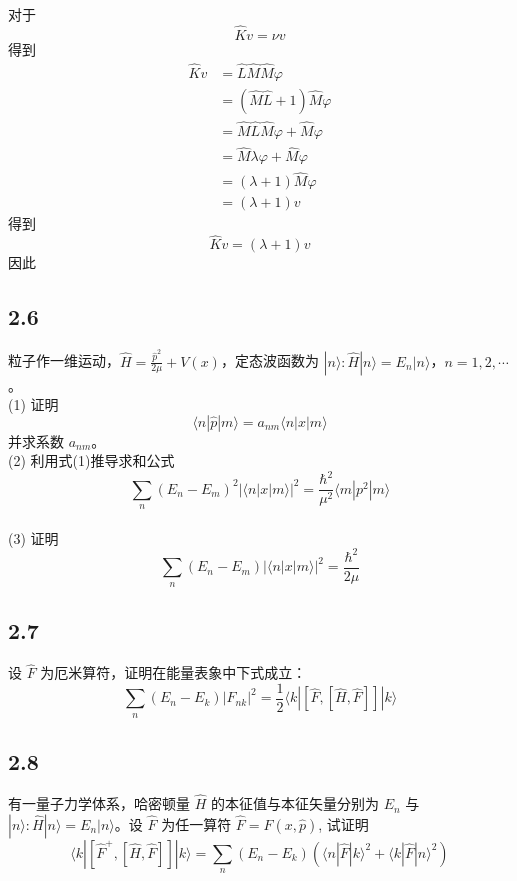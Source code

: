对于
\begin{equation}
    \hat{K}v=\nu v
\end{equation}
得到
\begin{equation}
    \begin{aligned}
        \hat{K}v&=\hat{L}\hat{M}\hat{M}\varphi 
\\
&=\left( \hat{M}\hat{L}+1 \right) \hat{M}\varphi 
\\
&=\hat{M}\hat{L}\hat{M}\varphi +\hat{M}\varphi 
\\
&=\hat{M}\lambda \varphi +\hat{M}\varphi 
\\
&=\left( \lambda +1 \right) \hat{M}\varphi 
\\
&=\left( \lambda +1 \right) v
    \end{aligned}
\end{equation}
得到
\begin{equation}
    \hat{K}v=\left( \lambda +1 \right) v
\end{equation}
因此

\subsection{2.6}
粒子作一维运动，$\hat{H} = \frac{\hat{p}^2}{2\mu} + V(x)$，定态波函数为 $|n\rangle : \hat{H}|n\rangle = E_n |n\rangle$，$n = 1, 2, \cdots$。
\\(1) 证明
$$\langle n | \hat{p} | m \rangle = a_{nm} \langle n | x | m \rangle \tag{1}$$
并求系数 $a_{nm}$。
\\(2) 利用式(1)推导求和公式
$$\sum_n (E_n - E_m)^2 | \langle n | x | m \rangle |^2 = \frac{\hbar^2}{\mu^2} \langle m | p^2 | m \rangle \tag{2}$$
\\(3) 证明
$$\sum_n (E_n - E_m) | \langle n | x | m \rangle |^2 = \frac{\hbar^2}{2\mu} \tag{3}$$

\subsection{2.7}
设 $\hat{F}$ 为厄米算符，证明在能量表象中下式成立：
$$\sum_{n} (E_n - E_k) |F_{nk}|^2 = \frac{1}{2} \langle k| [\hat{F}, [\hat{H}, \hat{F}]] |k \rangle$$

\subsection{2.8}
有一量子力学体系，哈密顿量 $\hat{H}$ 的本征值与本征矢量分别为 $E_n$ 与 $|n\rangle: \hat{H}|n\rangle = E_n|n\rangle$。设 $\hat{F}$ 为任一算符 $\hat{F} = \hat{F}(x, \hat{p})$, 试证明
$$\langle k|[\hat{F}^+, [\hat{H}, \hat{F}]] |k \rangle = \sum_{n} (E_n - E_k) \left( \langle n|\hat{F}|k\rangle^2 + \langle k|\hat{F}|n\rangle^2 \right)$$

